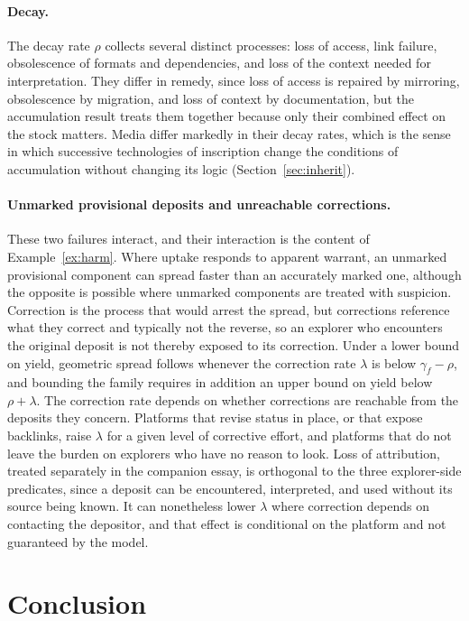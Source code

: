 \documentclass[11pt]{article}
\theoremstyle{definition}
\theoremstyle{remark}
\begin{document}
\paragraph{Decay.} The decay rate $\rho$ collects several distinct processes: loss of access, link failure, obsolescence of formats and dependencies, and loss of the context needed for interpretation. They differ in remedy, since loss of access is repaired by mirroring, obsolescence by migration, and loss of context by documentation, but the accumulation result treats them together because only their combined effect on the stock matters. Media differ markedly in their decay rates, which is the sense in which successive technologies of inscription change the conditions of accumulation without changing its logic (Section~\ref{sec:inherit}).

\paragraph{Unmarked provisional deposits and unreachable corrections.} These two failures interact, and their interaction is the content of Example~\ref{ex:harm}. Where uptake responds to apparent warrant, an unmarked provisional component can spread faster than an accurately marked one, although the opposite is possible where unmarked components are treated with suspicion. Correction is the process that would arrest the spread, but corrections reference what they correct and typically not the reverse, so an explorer who encounters the original deposit is not thereby exposed to its correction. Under a lower bound on yield, geometric spread follows whenever the correction rate $\lambda$ is below $\gamma_f-\rho$, and bounding the family requires in addition an upper bound on yield below $\rho+\lambda$. The correction rate depends on whether corrections are reachable from the deposits they concern. Platforms that revise status in place, or that expose backlinks, raise $\lambda$ for a given level of corrective effort, and platforms that do not leave the burden on explorers who have no reason to look. Loss of attribution, treated separately in the companion essay, is orthogonal to the three explorer-side predicates, since a deposit can be encountered, interpreted, and used without its source being known. It can nonetheless lower $\lambda$ where correction depends on contacting the depositor, and that effect is conditional on the platform and not guaranteed by the model.

\section{Conclusion}\label{sec:conc}
\end{document}
